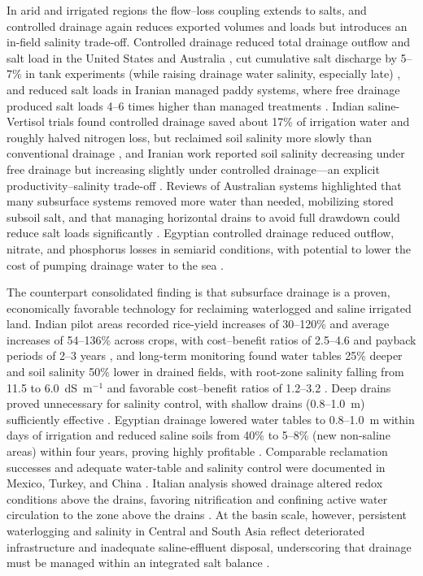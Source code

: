 In arid and irrigated regions the flow--loss coupling extends to salts, and
controlled drainage again reduces exported volumes and loads but introduces an
in-field salinity trade-off. Controlled drainage reduced total drainage outflow
and salt load in the United States and Australia \parencite{Ayars2006b}, cut
cumulative salt discharge by 5--7\% in tank experiments (while raising drainage
water salinity, especially late) \parencite{Zheng2025}, and reduced salt loads
in Iranian managed paddy systems, where free drainage produced salt loads 4--6
times higher than managed treatments \parencite{DarziNaftchali2018b}. Indian
saline-Vertisol trials found controlled drainage saved about 17\% of irrigation
water and roughly halved nitrogen loss, but reclaimed soil salinity more slowly
than conventional drainage \parencite{Karegoudar2019}, and Iranian work reported
soil salinity decreasing under free drainage but increasing slightly under
controlled drainage---an explicit productivity--salinity trade-off
\parencite{Jouni2018}. Reviews of Australian systems highlighted that many
subsurface systems removed more water than needed, mobilizing stored subsoil
salt, and that managing horizontal drains to avoid full drawdown could reduce
salt loads significantly \parencite{Christen2001}. Egyptian controlled drainage
reduced outflow, nitrate, and phosphorus losses in semiarid conditions, with
potential to lower the cost of pumping drainage water to the sea
\parencite{Wahba2001}.

The counterpart consolidated finding is that subsurface drainage is a proven,
economically favorable technology for reclaiming waterlogged and saline
irrigated land. Indian pilot areas recorded rice-yield increases of 30--120\%
and average increases of 54--136\% across crops, with cost--benefit ratios of
2.5--4.6 and payback periods of 2--3 years \parencite{Satyanarayana2007}, and
long-term monitoring found water tables 25\% deeper and soil salinity 50\% lower
in drained fields, with root-zone salinity falling from 11.5 to 6.0~dS~m$^{-1}$
and favorable cost--benefit ratios of 1.2--3.2 \parencite{Ritzema2008b}. Deep
drains proved unnecessary for salinity control, with shallow drains (0.8--1.0~m)
sufficiently effective \parencite{Ritzema2011,Satyanarayana2007}. Egyptian
drainage lowered water tables to 0.8--1.0~m within days of irrigation and
reduced saline soils from 40\% to 5--8\% (new non-saline areas) within four
years, proving highly profitable \parencite{Ali2001}. Comparable reclamation
successes and adequate water-table and salinity control were documented in
Mexico, Turkey, and China \parencite{MartínezBeltrán2007,Güngör2023,Shao2012,Yan2013b}.
Italian analysis showed drainage altered redox conditions above the drains,
favoring nitrification and confining active water circulation to the zone above
the drains \parencite{Mastrocicco2013}. At the basin scale, however, persistent
waterlogging and salinity in Central and South Asia reflect deteriorated
infrastructure and inadequate saline-effluent disposal, underscoring that
drainage must be managed within an integrated salt balance
\parencite{Dukhovny2007,Qureshi2008,Ritzema2016,SKAGGS1994}.

